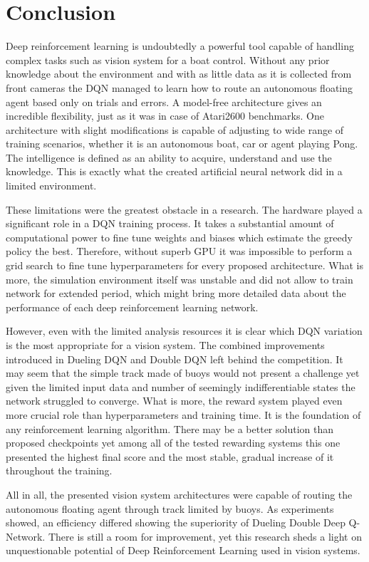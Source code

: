 \chapter{Conclusion}
\label{cha:conclusion}

Deep reinforcement learning is undoubtedly a powerful tool capable of handling complex tasks such as vision system for a boat control.
Without any prior knowledge about the environment and with as little data as it is collected from front cameras the DQN managed to
learn how to route an autonomous floating agent based only on trials and errors. A model-free architecture gives an incredible
flexibility, just as it was in case of Atari2600 benchmarks. One architecture with slight modifications is capable of adjusting to wide
range of training scenarios, whether it is an autonomous boat, car or agent playing Pong. The intelligence is defined as an ability to
acquire, understand and use the knowledge. This is exactly what the created artificial neural network did in a limited environment.

These limitations were the greatest obstacle in a research. The hardware played a significant role in a DQN training process. It takes a
substantial amount of computational power to fine tune weights and biases which estimate the greedy policy the best. Therefore, without
superb GPU it was impossible to perform a grid search to fine tune hyperparameters for every proposed architecture. What is more, the
simulation environment itself was unstable and did not allow to train network for extended period, which might bring more detailed data
about the performance of each deep reinforcement learning network.

However, even with the limited analysis resources it is clear which DQN variation is the most appropriate for a vision system. The
combined improvements introduced in Dueling DQN and Double DQN left behind the competition. It may seem that the simple track made of
buoys would not present a challenge yet given the limited input data and number of seemingly indifferentiable states the network
struggled to converge. What is more, the reward system played even more crucial role than hyperparameters and training time. It is
the foundation of any reinforcement learning algorithm. There may be a better solution than proposed checkpoints yet among all of the
tested rewarding systems this one presented the highest final score and the most stable, gradual increase of it throughout the training.

All in all, the presented vision system architectures were capable of routing the autonomous floating agent through track limited
by buoys. As experiments showed, an efficiency differed showing the superiority of Dueling Double Deep Q-Network. There is still a room
for improvement, yet this research sheds a light on unquestionable potential of Deep Reinforcement Learning used in vision systems.
